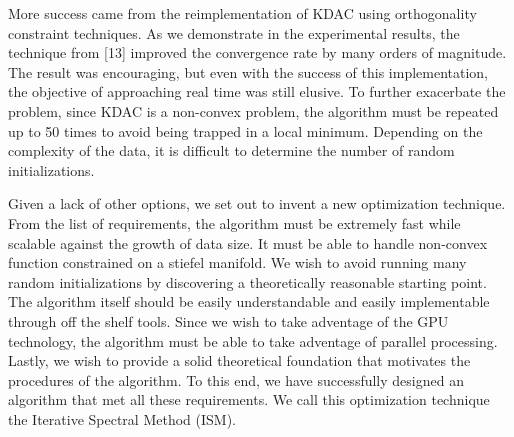 \documentclass{article}
\begin{document}
More success came from the reimplementation of KDAC using orthogonality
constraint techniques. As we demonstrate in the experimental results, the
technique from [13] improved the convergence rate by many orders of magnitude.
The result was encouraging, but even with the success of this implementation,
the objective of approaching real time was still elusive. To further
exacerbate the problem, since KDAC is a non-convex problem, the algorithm must
be repeated up to 50 times to avoid being trapped in a local minimum.
Depending on the complexity of the data, it is difficult to determine the
number of random initializations.

Given a lack of other options, we set out to invent a new optimization
technique. From the list of requirements, the algorithm must be extremely fast
while scalable against the growth of data size. It must be able to handle
non-convex function constrained on a stiefel manifold. We wish to avoid
running many random initializations by discovering a theoretically reasonable
starting point. The algorithm itself should be easily understandable and
easily implementable through off the shelf tools. Since we wish to take
adventage of the GPU technology, the algorithm must be able to take adventage
of parallel processing. Lastly, we wish to provide a solid theoretical
foundation that motivates the procedures of the algorithm. To this end, we
have successfully designed an algorithm that met all these requirements. We
call this optimization technique the Iterative Spectral Method (ISM).
\end{document}
